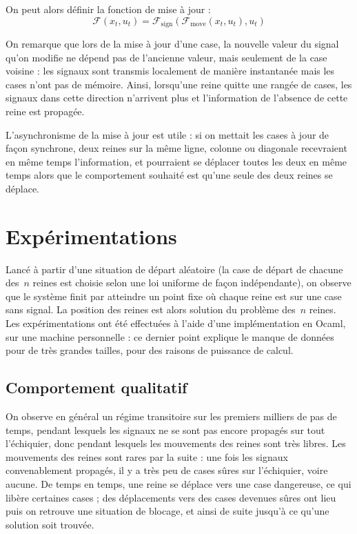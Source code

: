 \noindent
On peut alors définir la fonction de mise à jour : $$\mathcal{F}(x_t, u_t) = \mathcal{F}_{\mathrm{sign}}(\mathcal{F}_{\mathrm{move}}(x_t, u_t), u_t)$$


On remarque que lors de la mise à jour d'une case, la nouvelle valeur du signal qu'on modifie ne dépend pas de l'ancienne valeur, mais seulement de la case voisine : les signaux sont transmis localement de manière instantanée mais les cases n'ont pas de mémoire. Ainsi, lorsqu'une reine quitte une rangée de cases, les signaux dans cette direction n'arrivent plus et l'information de l'absence de cette reine est propagée. 

L'asynchronisme de la mise à jour est utile : si on mettait les cases à jour de façon synchrone, deux reines sur la même ligne, colonne ou diagonale recevraient en même temps l'information, et pourraient se déplacer toutes les deux en même temps alors que le comportement souhaité est qu'une seule des deux reines se déplace. 










\section{Expérimentations}


Lancé à partir d'une situation de départ aléatoire (la case de départ de chacune des~$n$ reines est choisie selon une loi uniforme de façon indépendante), on observe que le système finit par atteindre un point fixe où chaque reine est sur une case sans signal. La position des reines est alors solution du problème des~$n$ reines. Les expérimentations ont été effectuées à l'aide d'une implémentation en Ocaml, sur une machine personnelle : ce dernier point explique le manque de données pour de très grandes tailles, pour des raisons de puissance de calcul.

\subsection{Comportement qualitatif}

On observe en général un régime transitoire sur les premiers milliers de pas de temps, pendant lesquels les signaux ne se sont pas encore propagés sur tout l'échiquier, donc pendant lesquels les mouvements des reines sont très libres. %
Les mouvements des reines sont rares par la suite : une fois les signaux convenablement propagés, il y a très peu de cases sûres sur l'échiquier, voire aucune. De temps en temps, une reine se déplace vers une case dangereuse, ce qui libère certaines cases ; des déplacements vers des cases devenues sûres ont lieu puis on retrouve une situation de blocage, et ainsi de suite jusqu'à ce qu'une solution soit trouvée.

